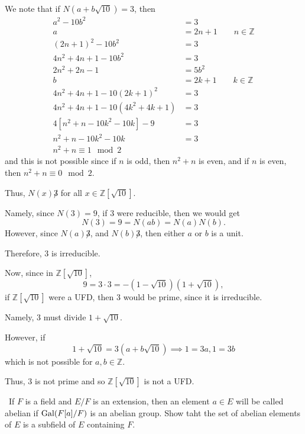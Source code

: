 \documentclass[12pt]{AlgebraQual}
\begin{document}
\begin{solution}
We note that if $N(a+b\sqrt{10})=3$, then \begin{align*}
    a^2-10b^2&=3\\
    a&=2n+1\qquad n\in\mathbb{Z}\\
    (2n+1)^2-10b^2&=3\\
    4n^2+4n+1-10b^2&=3\\
    2n^2+2n-1&=5b^2\\
    b&=2k+1\qquad k\in\mathbb{Z}\\
    4n^2+4n+1-10(2k+1)^2&=3\\
    4n^2+4n+1-10(4k^2+4k+1)&=3\\
    4[n^2+n-10k^2-10k]-9&=3\\
    n^2+n-10k^2-10k&=3\\
    n^2+n\equiv 1\mod 2
\end{align*} and this is not possible since if $n$ is odd, then $n^2+n$ is even, and if $n$ is even, then $n^2+n\equiv 0\mod 2$.

Thus, $N(x)\not3$ for all $x\in\mathbb{Z}[\sqrt{10}].$

Namely, since $N(3)=9$, if $3$ were reducible, then we would get $$N(3)=9=N(ab)=N(a)N(b).$$ However, since $N(a)\not3$, and $N(b)\not3$, then either $a$ or $b$ is a unit.

Therefore, $3$ is irreducible.

Now, since in $\mathbb{Z}[\sqrt{10}]$, $$9=3\cdot 3=-(1-\sqrt{10})(1+\sqrt{10}),$$ if $\mathbb{Z}[\sqrt{10}]$ were a UFD, then $3$ would be prime, since it is irreducible.

Namely, $3$ must divide $1+\sqrt{10}$.

However, if $$1+\sqrt{10}=3(a+b\sqrt{10})\implies 1=3a, 1=3b$$ which is not possible for $a,b\in\mathbb{Z}$.

Thus, $3$ is not prime and so $\mathbb{Z}[\sqrt{10}]$ is not a UFD.
\end{solution}
\newpage

\begin{problem} $\,$
If $F$ is a field and $E/F$ is an extension, then an element $a\in E$ will be called abelian if $\text{Gal}(F[a]/F)$ is an abelian group. Show taht the set of abelian elements of $E$ is a subfield of $E$ containing $F$.
\end{problem}
\end{document}
